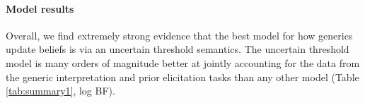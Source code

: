 \documentclass[floatsintext,doc]{apa6}
\let\oldparagraph\paragraph
\renewcommand{\paragraph}[1]{\oldparagraph{#1}\mbox{}}
\begin{document}
\hypertarget{model-criticism}{%
\paragraph{Model results}\label{model-criticism}}
%
Overall, we find extremely strong evidence that the best model for how generics update beliefs is via an uncertain threshold semantics. 
The uncertain threshold model is many orders of magnitude better at jointly accounting for the data from the generic interpretation and prior elicitation tasks than any other model (Table \ref{tab:summary1}, log BF). 

\end{document}

